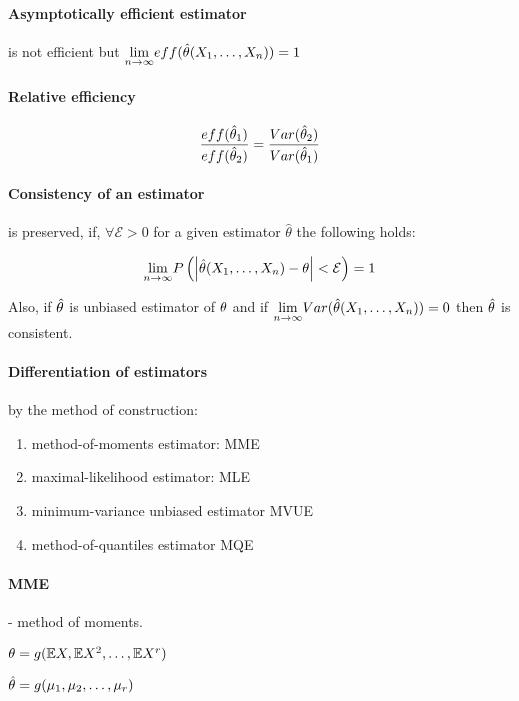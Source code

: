 \paragraph{Asymptotically efficient estimator}
is not efficient but $\underset{n \rightarrow \infty}{\lim} eff(\hat{\theta}(X_{1}, \ldots, X_{n})) = 1 $

\paragraph{Relative efficiency}
\[ \frac{eff(\hat{\theta}_1)}{eff(\hat{\theta}_2)} = \frac{Var(\hat{\theta}_2)}{Var(\hat{\theta}_1)} \]

\paragraph{Consistency of an estimator}
is preserved, if, $\forall \mathcal{E} > 0$ for a given estimator $\hat{\theta}$ the following holds:

\[ \underset{n \rightarrow \infty}{\lim}
 P \left( \left| \hat{\theta}(X_{1}, \ldots, X_{n}) - \theta \right| < \mathcal{E} \right) = 1 \]

Also, if $\hat{\theta}$ is unbiased estimator of $\theta$
and if $ \underset{n \rightarrow \infty}{\lim} Var(\hat{\theta}(X_{1}, \ldots, X_{n})) = 0 $ then $\hat{\theta}$ is consistent.

\paragraph{Differentiation of estimators}
by the method of construction:

\begin{enumerate}
  \item method-of-moments estimator: MME
  
  \item maximal-likelihood estimator: MLE
  
  \item minimum-variance unbiased estimator MVUE
  
  \item method-of-quantiles estimator MQE
\end{enumerate}

\paragraph{MME}
- method of moments.

$ \theta = g(\mathbb{E}X, \mathbb{E}X^2, \ldots, \mathbb{E}X^r) $

$ \hat{\theta} = g(\mu_1,\mu_2,\ldots,\mu_r) $

